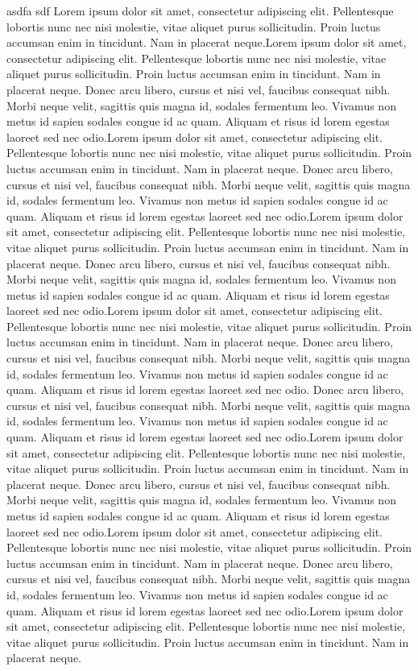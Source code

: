 \documentclass{book}
\begin{document}
    asdfa sdf Lorem ipsum dolor sit amet, consectetur adipiscing elit. Pellentesque lobortis nunc nec nisi molestie, vitae aliquet purus sollicitudin. Proin luctus accumsan enim in tincidunt. Nam in placerat neque.Lorem ipsum dolor sit amet, consectetur adipiscing elit. Pellentesque lobortis nunc nec nisi molestie, vitae aliquet purus sollicitudin. Proin luctus accumsan enim in tincidunt. Nam in placerat neque. Donec arcu libero, cursus et nisi vel, faucibus consequat nibh. Morbi neque velit, sagittis quis magna id, sodales fermentum leo. Vivamus non metus id sapien sodales congue id ac quam. Aliquam et risus id lorem egestas laoreet sed nec odio.Lorem ipsum dolor sit amet, consectetur adipiscing elit. Pellentesque lobortis nunc nec nisi molestie, vitae aliquet purus sollicitudin. Proin luctus accumsan enim in tincidunt. Nam in placerat neque. Donec arcu libero, cursus et nisi vel, faucibus consequat nibh. Morbi neque velit, sagittis quis magna id, sodales fermentum leo. Vivamus non metus id sapien sodales congue id ac quam. Aliquam et risus id lorem egestas laoreet sed nec odio.Lorem ipsum dolor sit amet, consectetur adipiscing elit. Pellentesque lobortis nunc nec nisi molestie, vitae aliquet purus sollicitudin. Proin luctus accumsan enim in tincidunt. Nam in placerat neque. Donec arcu libero, cursus et nisi vel, faucibus consequat nibh. Morbi neque velit, sagittis quis magna id, sodales fermentum leo. Vivamus non metus id sapien sodales congue id ac quam. Aliquam et risus id lorem egestas laoreet sed nec odio.Lorem ipsum dolor sit amet, consectetur adipiscing elit. Pellentesque lobortis nunc nec nisi molestie, vitae aliquet purus sollicitudin. Proin luctus accumsan enim in tincidunt. Nam in placerat neque. Donec arcu libero, cursus et nisi vel, faucibus consequat nibh. Morbi neque velit, sagittis quis magna id, sodales fermentum leo. Vivamus non metus id sapien sodales congue id ac quam. Aliquam et risus id lorem egestas laoreet sed nec odio. Donec arcu libero, cursus et nisi vel, faucibus consequat nibh. Morbi neque velit, sagittis quis magna id, sodales fermentum leo. Vivamus non metus id sapien sodales congue id ac quam. Aliquam et risus id lorem egestas laoreet sed nec odio.Lorem ipsum dolor sit amet, consectetur adipiscing elit. Pellentesque lobortis nunc nec nisi molestie, vitae aliquet purus sollicitudin. Proin luctus accumsan enim in tincidunt. Nam in placerat neque. Donec arcu libero, cursus et nisi vel, faucibus consequat nibh. Morbi neque velit, sagittis quis magna id, sodales fermentum leo. Vivamus non metus id sapien sodales congue id ac quam. Aliquam et risus id lorem egestas laoreet sed nec odio.Lorem ipsum dolor sit amet, consectetur adipiscing elit. Pellentesque lobortis nunc nec nisi molestie, vitae aliquet purus sollicitudin. Proin luctus accumsan enim in tincidunt. Nam in placerat neque. Donec arcu libero, cursus et nisi vel, faucibus consequat nibh. Morbi neque velit, sagittis quis magna id, sodales fermentum leo. Vivamus non metus id sapien sodales congue id ac quam. Aliquam et risus id lorem egestas laoreet sed nec odio.Lorem ipsum dolor sit amet, consectetur adipiscing elit. Pellentesque lobortis nunc nec nisi molestie, vitae aliquet purus sollicitudin. Proin luctus accumsan enim in tincidunt. Nam in placerat neque. 
\end{document}
